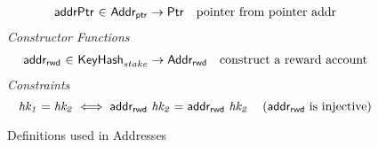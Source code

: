 \begin{figure*}[hbt]
\begin{equation*}
\begin{array}{r@{~\in~}lr}
      \fun{addrPtr} & \AddrP \to \Ptr
                    & \text{pointer from pointer addr}\\
    \end{array}
  \end{equation*}
  \emph{Constructor Functions}
  \begin{equation*}
    \begin{array}{r@{~\in~}lr}
      \fun{addr_{rwd}}
        & \KeyHash_{stake} \to \AddrRWD
        & \text{construct a reward account}
    \end{array}
  \end{equation*}
  \emph{Constraints}
  \begin{equation*}
    \mathit{hk_1} = \mathit{hk_2} \iff \mathsf{addr_{rwd}}~\mathit{hk_2} = \mathsf{addr_{rwd}}~\mathit{hk_2}
    ~~~ \left( \mathsf{addr_{rwd}} \text{ is injective} \right)
  \end{equation*}
  \caption{Definitions used in Addresses}
  \label{fig:defs:addresses}
\end{figure*}

\clearpage
